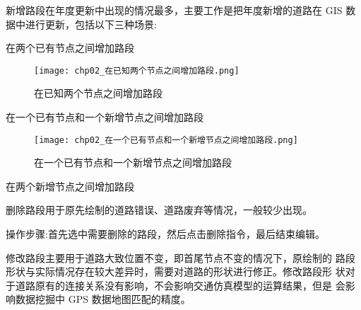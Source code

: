 新增路段在年度更新中出现的情况最多，主要工作是把年度新增的道路在
GIS 数据中进行更新，包括以下三种场景:

\begin{nbeae}
\item 在两个已有节点之间增加路段\\



\begin{figure}[ht]
  \centering
  \texttt{[image: chp02\_在已知两个节点之间增加路段.png]}
  \caption{在已知两个节点之间增加路段\label{fig:在已知两个节点之间增加路段} }
\end{figure}

\item 在一个已有节点和一个新增节点之间增加路段\\


\begin{figure}[ht]
  \centering
  \texttt{[image: chp02\_在一个已有节点和一个新增节点之间增加路段.png]}
  \caption{在一个已有节点和一个新增节点之间增加路段\label{fig:在一个已有节点和一个新增节点之间增加路段} }
\end{figure}

\item 在两个新增节点之间增加路段\\
\end{nbeae}

删除路段用于原先绘制的道路错误、道路废弃等情况，一般较少出现。

操作步骤:首先选中需要删除的路段，然后点击删除指令，最后结束编辑。

修改路段主要用于道路大致位置不变，即首尾节点不变的情况下，原绘制的
路段形状与实际情况存在较大差异时，需要对道路的形状进行修正。修改路段形
状对于道路原有的连接关系没有影响，不会影响交通仿真模型的运算结果，但是
会影响数据挖掘中 GPS 数据地图匹配的精度。


